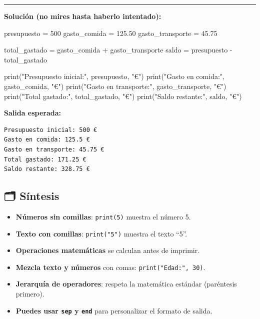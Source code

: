 \documentclass[
  doc,
  floatsintext,
  longtable,
  a4paper,
  nolmodern,
  notxfonts,
  notimes,
  12pt,
  colorlinks=true,linkcolor=blue,citecolor=blue,urlcolor=blue]{apa7}
\newenvironment{Shaded}{\begin{snugshade}}{\end{snugshade}}
\newcommand{\BuiltInTok}[1]{\textcolor[rgb]{0.00,0.23,0.31}{#1}}
\newcommand{\DecValTok}[1]{\textcolor[rgb]{0.68,0.00,0.00}{#1}}
\newcommand{\FloatTok}[1]{\textcolor[rgb]{0.68,0.00,0.00}{#1}}
\newcommand{\NormalTok}[1]{\textcolor[rgb]{0.00,0.23,0.31}{#1}}
\newcommand{\OperatorTok}[1]{\textcolor[rgb]{0.37,0.37,0.37}{#1}}
\newcommand{\StringTok}[1]{\textcolor[rgb]{0.13,0.47,0.30}{#1}}
\providecommand{\tightlist}{%
  \setlength{\itemsep}{0pt}\setlength{\parskip}{0pt}}
\begin{document}
\begin{center}\rule{0.5\linewidth}{0.5pt}\end{center}

\textbf{Solución (no mires hasta haberlo intentado):}

\begin{Shaded}
\begin{Highlighting}[]
\NormalTok{presupuesto }\OperatorTok{=} \DecValTok{500}
\NormalTok{gasto\_comida }\OperatorTok{=} \FloatTok{125.50}
\NormalTok{gasto\_transporte }\OperatorTok{=} \FloatTok{45.75}

\NormalTok{total\_gastado }\OperatorTok{=}\NormalTok{ gasto\_comida }\OperatorTok{+}\NormalTok{ gasto\_transporte}
\NormalTok{saldo }\OperatorTok{=}\NormalTok{ presupuesto }\OperatorTok{{-}}\NormalTok{ total\_gastado}

\BuiltInTok{print}\NormalTok{(}\StringTok{"Presupuesto inicial:"}\NormalTok{, presupuesto, }\StringTok{"€"}\NormalTok{)}
\BuiltInTok{print}\NormalTok{(}\StringTok{"Gasto en comida:"}\NormalTok{, gasto\_comida, }\StringTok{"€"}\NormalTok{)}
\BuiltInTok{print}\NormalTok{(}\StringTok{"Gasto en transporte:"}\NormalTok{, gasto\_transporte, }\StringTok{"€"}\NormalTok{)}
\BuiltInTok{print}\NormalTok{(}\StringTok{"Total gastado:"}\NormalTok{, total\_gastado, }\StringTok{"€"}\NormalTok{)}
\BuiltInTok{print}\NormalTok{(}\StringTok{"Saldo restante:"}\NormalTok{, saldo, }\StringTok{"€"}\NormalTok{)}
\end{Highlighting}
\end{Shaded}

\textbf{Salida esperada:}

\begin{verbatim}
Presupuesto inicial: 500 €
Gasto en comida: 125.5 €
Gasto en transporte: 45.75 €
Total gastado: 171.25 €
Saldo restante: 328.75 €
\end{verbatim}

\subsection{🗂️ Síntesis}\label{suxedntesis}

\begin{itemize}
\tightlist
\item
  \textbf{Números sin comillas}: \texttt{print(5)} muestra el número 5.
\item
  \textbf{Texto con comillas}: \texttt{print("5")} muestra el texto
  ``5''.
\item
  \textbf{Operaciones matemáticas} se calculan antes de imprimir.
\item
  \textbf{Mezcla texto y números} con comas:
  \texttt{print("Edad:",\ 30)}.
\item
  \textbf{Jerarquía de operadores}: respeta la matemática estándar
  (paréntesis primero).
\item
  \textbf{Puedes usar \texttt{sep} y \texttt{end}} para personalizar el
  formato de salida.
\end{itemize}
\end{document}
